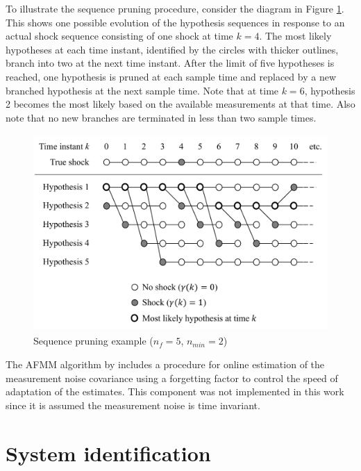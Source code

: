 To illustrate the sequence pruning procedure, consider the diagram in Figure \ref{fig:mm-obs-seq-erik}. This shows one possible evolution of the hypothesis sequences in response to an actual shock sequence consisting of one shock at time $k=4$.  The most likely hypotheses at each time instant, identified by the circles with thicker outlines, branch into two at the next time instant. After the limit of five hypotheses is reached, one hypothesis is pruned at each sample time and replaced by a new branched hypothesis at the next sample time. Note that at time $k=6$, hypothesis 2 becomes the most likely based on the available measurements at that time. Also note that no new branches are terminated in less than two sample times.

\begin{figure}[htp]
	\centering
	\includegraphics[height=7.5cm]{images/mm_obs_seq_erik.pdf}
	\caption{Sequence pruning example ($n_f=5$, $n_{min}=2$)}
	\label{fig:mm-obs-seq-erik}
\end{figure}

The AFMM algorithm by \cite{gustafsson_estimation_1993} includes a procedure for online estimation of the measurement noise covariance using a forgetting factor to control the speed of adaptation of the estimates. This component was not implemented in this work since it is assumed the measurement noise is time invariant.

\section{System identification}

